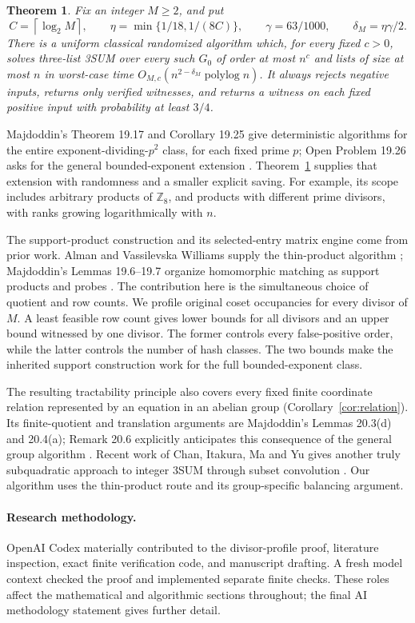 \documentclass[acmsmall,11pt,nonacm,natbib=false]{acmart}
\newtheorem{theorem}{Theorem}
\newcommand{\Z}{\mathbb Z}
\newcommand{\polylog}{\operatorname{polylog}}
\newcommand{\ceil}[1]{\left\lceil #1\right\rceil}
\begin{document}
\begin{theorem}\label{thm:main}
Fix an integer $M\ge2$, and put
\[
 C=\ceil{\log_2 M},\qquad
 \eta=\min\{1/18,1/(8C)\},\qquad
 \gamma=63/1000,\qquad \delta_M=\eta\gamma/2.
\]
There is a uniform classical randomized algorithm which, for every fixed
$c>0$, solves three-list 3SUM over every such $G_0$ of order at most $n^c$
and lists of size at most $n$ in worst-case time
$O_{M,c}(n^{2-\delta_M}\polylog n)$. It always rejects negative inputs,
returns only verified witnesses, and returns a witness on each fixed
positive input with probability at least $3/4$.
\end{theorem}

Majdoddin's Theorem 19.17 and Corollary 19.25 give deterministic algorithms
for the entire exponent-dividing-$p^2$ class, for each fixed prime $p$;
Open Problem 19.26 asks for the general bounded-exponent extension
\cite{Maj26}. Theorem~\ref{thm:main} supplies that extension with randomness
and a smaller explicit saving. For example, its scope includes arbitrary
products of $\Z_8$, and products with different prime divisors, with ranks
growing logarithmically with $n$.

The support-product construction and its selected-entry matrix engine come
from prior work. Alman and Vassilevska Williams supply the thin-product
algorithm \cite{AVW26}; Majdoddin's Lemmas 19.6--19.7 organize homomorphic
matching as support products and probes \cite{Maj26}. The contribution here
is the simultaneous choice of quotient and row counts. We profile original
coset occupancies for every divisor of $M$. A least feasible row count gives
lower bounds for all divisors and an upper bound witnessed by one divisor.
The former controls every false-positive order, while the latter controls
the number of hash classes. The two bounds make the inherited support
construction work for the full bounded-exponent class.

The resulting tractability principle also covers every fixed finite
coordinate relation represented by an equation in an abelian group
(Corollary~\ref{cor:relation}). Its finite-quotient and translation arguments
are Majdoddin's Lemmas 20.3(d) and 20.4(a); Remark 20.6 explicitly anticipates
this consequence of the general group algorithm \cite{Maj26}. Recent work
of Chan, Itakura, Ma and Yu gives another truly subquadratic approach to
integer 3SUM through subset convolution \cite{CIMY26}. Our algorithm uses
the thin-product route and its group-specific balancing argument.

\paragraph{Research methodology.}
OpenAI Codex materially contributed to the divisor-profile proof, literature
inspection, exact finite verification code, and manuscript drafting. A fresh
model context checked the proof and implemented separate finite checks.
These roles affect the mathematical and algorithmic sections throughout;
the final AI methodology statement gives further detail.
\end{document}
